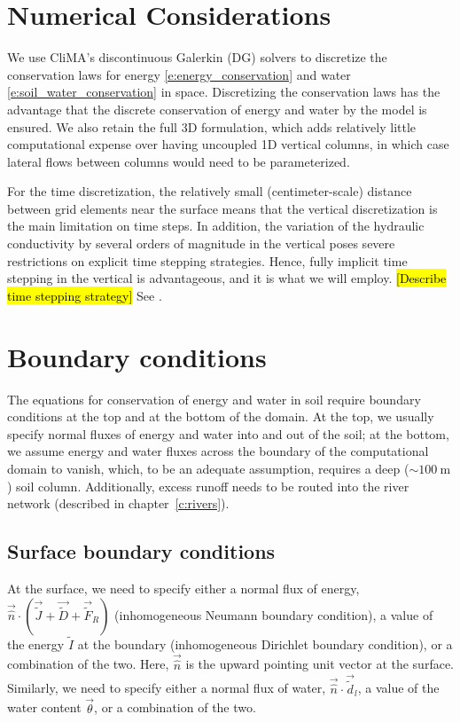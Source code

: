 \documentclass[twoside,10pt]{report}
\begin{document}
\section{Numerical Considerations}

We use CliMA's discontinuous Galerkin (DG) solvers \citep[cf.][]{Maet14a} to discretize the conservation laws for energy \eqref{e:energy_conservation} and water \eqref{e:soil_water_conservation} in space. Discretizing the conservation laws has the advantage that the discrete conservation of energy and water by the model is ensured. We also retain the full 3D formulation, which adds relatively little computational expense over having uncoupled 1D vertical columns, in which case lateral flows between columns would need to be parameterized. 

For the time discretization, the relatively small (centimeter-scale) distance between grid elements near the surface means that the vertical discretization is the main limitation on time steps. In addition, the variation of the hydraulic conductivity by several orders of magnitude in the vertical poses severe restrictions on explicit time stepping strategies. Hence, fully implicit time stepping in the vertical is advantageous, and it is what we will employ. \hl{[Describe time stepping strategy]} See \citet{List16a}. 

\section{Boundary conditions}\label{s:soil_boundary_conditions}

The equations for conservation of energy and water in soil require boundary conditions at the top and at the bottom of the domain. At the top, we usually specify normal fluxes of energy and water into and out of the soil; at the bottom, we assume energy and water fluxes across the boundary of the computational domain to vanish, which, to be an adequate assumption, requires a deep ($\sim{} 100~\mathrm{m}$) soil column. Additionally, excess runoff needs to be routed into the river network (described in chapter~\ref{c:rivers}).

\subsection{Surface boundary conditions}

At the surface, we need to specify either a normal flux of energy, $\vec{\hat n} \cdot (\vec{\tilde J} + \vec{\tilde D} + \vec{\tilde F}_R)$ (inhomogeneous Neumann boundary condition), a value of the energy $\tilde I$ at the boundary (inhomogeneous Dirichlet boundary condition), or a combination of the two. Here, $\vec{\hat n}$ is the upward pointing unit vector at the surface. Similarly, we need to specify either a normal flux of water, $\vec{\hat n} \cdot \vec{\tilde d}_l$, a value of the water content $\vec{\theta}$, or a combination of the two. 
\end{document}
